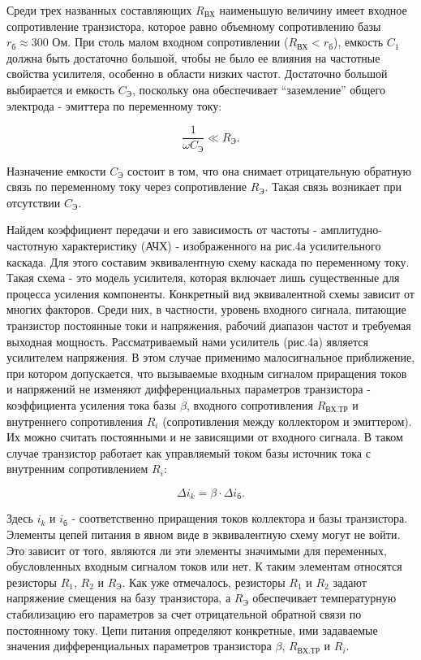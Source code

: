 Среди трех названных составляющих $R_{\text{ВХ}}$ наименьшую величину имеет входное сопротивление транзистора, которое равно объемному сопротивлению базы $r_{\text{б}}\approx 300\text{ Ом}$. При столь малом входном сопротивлении ($R_{\text{ВХ}}<r_{\text{б}}$), емкость $C_1$ должна быть достаточно большой, чтобы не было ее влияния на частотные свойства усилителя, особенно в области низких частот. Достаточно большой выбирается и емкость $C_{\text{Э}}$, поскольку она обеспечивает “заземление” общего электрода - эмиттера по переменному току:

\begin{equation}
	\frac{1}{\omega C_{\text{Э}}}\ll R_{\text{Э}}.
	\label{eq:2}
\end{equation}

Назначение емкости $C_{\text{Э}}$ состоит в том, что она снимает отрицательную обратную связь по переменному току через сопротивление $R_{\text{Э}}$. Такая связь возникает при отсутствии $C_{\text{Э}}$.

Найдем коэффициент передачи и его зависимость от частоты - амплитудно-частотную характеристику (АЧХ) - изображенного на рис.4а усилительного каскада. Для этого составим эквивалентную схему каскада по переменному току. Такая схема - это модель усилителя, которая включает лишь существенные для процесса усиления компоненты. Конкретный вид эквивалентной схемы зависит от многих факторов. Среди них, в частности, уровень входного сигнала, питающие транзистор постоянные токи и
напряжения, рабочий диапазон частот и требуемая выходная мощность. Рассматриваемый нами усилитель (рис.4а) является усилителем напряжения. В этом случае применимо малосигнальное приближение, при котором допускается, что вызываемые входным
сигналом приращения токов и напряжений не изменяют дифференциальных параметров транзистора - коэффициента усиления тока базы $\beta$, входного сопротивления $R_{\text{ВХ.ТР}}$ и внутреннего сопротивления $R_i$ (сопротивления между коллектором и эмиттером). Их можно считать постоянными и не зависящими от входного сигнала. В таком случае транзистор работает как управляемый током базы источник тока с внутренним сопротивлением $R_i$:

$$\Delta i_k = \beta \cdot \Delta i_{\text{б}}.$$

Здесь $i_k$ и $i_{\text{б}}$ - соответственно приращения токов коллектора и базы транзистора. Элементы цепей питания в явном виде в эквивалентную схему могут не войти. Это зависит от того, являются ли эти элементы значимыми для переменных, обусловленных входным сигналом токов или нет. К таким элементам относятся резисторы $R_1$, $R_2$ и $R_{\text{Э}}$. Как уже отмечалось, резисторы $R_1$ и $R_2$ задают напряжение смещения на базу транзистора, а $R_{\text{Э}}$ обеспечивает температурную стабилизацию его параметров за счет отрицательной обратной связи по постоянному току. Цепи питания определяют конкретные, ими задаваемые значения дифференциальных параметров транзистора $\beta$, $R_{\text{ВХ.ТР}}$ и $R_i$.

